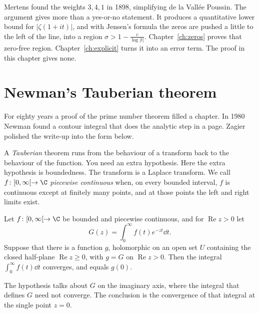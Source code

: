 \begin{remark}
Mertens found the weights $3,4,1$ in 1898, simplifying de la Vallée Poussin. The argument gives more than a yes-or-no statement. It produces a quantitative lower bound for $|\zeta(1+it)|$, and with Jensen's formula the zeros are pushed a little to the left of the line, into a region $\sigma>1-\frac c{\log|t|}$. Chapter~\ref{ch:zeros} proves that zero-free region. Chapter~\ref{ch:explicit} turns it into an error term. The proof in this chapter gives none.
\end{remark}

\section{Newman's Tauberian theorem}

For eighty years a proof of the prime number theorem filled a chapter. In 1980 Newman found a contour integral that does the analytic step in a page. Zagier polished the write-up into the form below.

A \emph{Tauberian} theorem runs from the behaviour of a transform back to the behaviour of the function. You need an extra hypothesis. Here the extra hypothesis is boundedness. The transform is a Laplace transform. We call $f\colon[0,\infty[\to\C$ \emph{piecewise continuous} when, on every bounded interval, $f$ is continuous except at finitely many points, and at those points the left and right limits exist.

\begin{theorem}[Newman, 1980]\label{thm:newman}
Let $f\colon[0,\infty[\to\C$ be bounded and piecewise continuous, and for $\operatorname{Re}z>0$ let
\[
G(z)=\int_0^\infty f(t)e^{-zt}\dd t.
\]
Suppose that there is a function $g$, holomorphic on an open set $U$ containing the closed half-plane $\operatorname{Re}z\ge0$, with $g=G$ on $\operatorname{Re}z>0$. Then the integral
$\int_0^\infty f(t)\dd t$ converges, and equals $g(0)$.
\end{theorem}

The hypothesis talks about $G$ on the imaginary axis, where the integral that defines $G$ need not converge. The conclusion is the convergence of that integral at the single point $z=0$.

